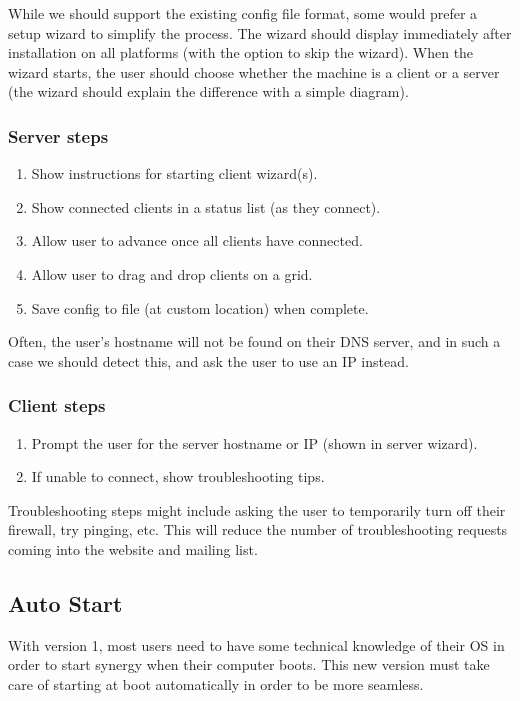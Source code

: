 While we should support the existing config file format, some would prefer a
setup wizard to simplify the process. The wizard should display immediately
after installation on all platforms (with the option to skip the wizard). When
the wizard starts, the user should choose whether the machine is a client or a
server (the wizard should explain the difference with a simple diagram).


\subsubsection{Server steps}
\begin{enumerate}
  \item Show instructions for starting client wizard(s).
  \item Show connected clients in a status list (as they connect).
  \item Allow user to advance once all clients have connected.
  \item Allow user to drag and drop clients on a grid.
  \item Save config to file (at custom location) when complete.
\end{enumerate}

Often, the user's hostname will not be found on their DNS server, and in such
a case we should detect this, and ask the user to use an IP instead.

\subsubsection{Client steps}
\begin{enumerate}
  \item Prompt the user for the server hostname or IP (shown in server wizard).
  \item If unable to connect, show troubleshooting tips.
\end{enumerate}

Troubleshooting steps might include asking the user to temporarily turn off
their firewall, try pinging, etc. This will reduce the number of troubleshooting
requests coming into the website and mailing list.

\subsection{Auto Start}

With version 1, most users need to have some technical knowledge of their OS
in order to start synergy when their computer boots. This new version must
take care of starting at boot automatically in order to be more seamless.

